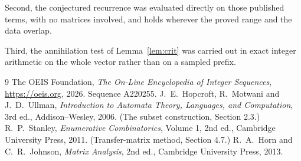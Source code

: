 \documentclass[11pt,a4paper]{article}
\theoremstyle{plain}
\theoremstyle{definition}
\begin{document}
Second, the conjectured recurrence was evaluated directly on those published terms, with no
matrices involved, and holds wherever the proved range and the data overlap.

Third, the annihilation test of Lemma~\ref{lem:crit} was carried out in exact integer
arithmetic on the whole vector rather than on a sampled prefix.

\begin{thebibliography}{9}
 The OEIS Foundation, \emph{The On-Line Encyclopedia of Integer
Sequences}, \url{https://oeis.org}, 2026. Sequence A220255.
 J.~E.~Hopcroft, R.~Motwani and J.~D.~Ullman, \emph{Introduction to Automata
Theory, Languages, and Computation}, 3rd ed., Addison--Wesley, 2006. (The subset
construction, Section 2.3.)
 R.~P.~Stanley, \emph{Enumerative Combinatorics}, Volume 1, 2nd ed.,
Cambridge University Press, 2011. (Transfer-matrix method, Section 4.7.)
 R.~A.~Horn and C.~R.~Johnson, \emph{Matrix Analysis}, 2nd ed., Cambridge
University Press, 2013.
\end{thebibliography}
\end{document}
